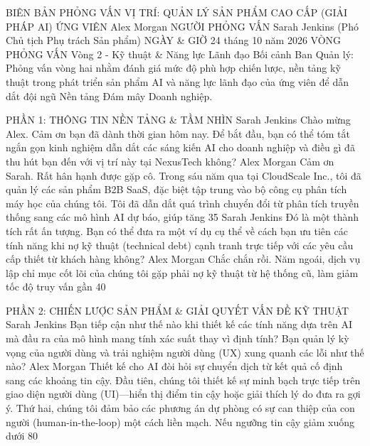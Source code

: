 BIÊN BẢN PHỎNG VẤN
VỊ TRÍ: QUẢN LÝ SẢN PHẨM CAO CẤP (GIẢI PHÁP AI)
ỨNG VIÊN
Alex Morgan
NGƯỜI PHỎNG VẤN
Sarah Jenkins (Phó Chủ tịch Phụ trách Sản phẩm)
NGÀY & GIỜ
24 tháng 10 năm 2026
VÒNG PHỎNG VẤN
Vòng 2 - Kỹ thuật & Năng lực Lãnh đạo
Bối cảnh Ban Quản lý: Phỏng vấn vòng hai nhằm đánh giá mức độ phù hợp chiến lược, nền tảng kỹ thuật trong phát triển sản phẩm AI và năng lực lãnh đạo của ứng viên để dẫn dắt đội ngũ Nền tảng Đám mây Doanh nghiệp.

PHẦN 1: THÔNG TIN NỀN TẢNG & TẦM NHÌN
Sarah Jenkins
Chào mừng Alex. Cảm ơn bạn đã dành thời gian hôm nay. Để bắt đầu, bạn có thể tóm tắt ngắn gọn kinh nghiệm dẫn dắt các sáng kiến AI cho doanh nghiệp và điều gì đã thu hút bạn đến với vị trí này tại NexusTech không?
Alex Morgan
Cảm ơn Sarah. Rất hân hạnh được gặp cô. Trong sáu năm qua tại CloudScale Inc., tôi đã quản lý các sản phẩm B2B SaaS, đặc biệt tập trung vào bộ công cụ phân tích máy học của chúng tôi. Tôi đã dẫn dắt quá trình chuyển đổi từ phân tích truyền thống sang các mô hình AI dự báo, giúp tăng 35%
Sarah Jenkins
Đó là một thành tích rất ấn tượng. Bạn có thể đưa ra một ví dụ cụ thể về cách bạn ưu tiên các tính năng khi nợ kỹ thuật (technical debt) cạnh tranh trực tiếp với các yêu cầu cấp thiết từ khách hàng không?
Alex Morgan
Chắc chắn rồi. Năm ngoái, dịch vụ lập chỉ mục cốt lõi của chúng tôi gặp phải nợ kỹ thuật từ hệ thống cũ, làm giảm tốc độ truy vấn gần 40%

PHẦN 2: CHIẾN LƯỢC SẢN PHẨM & GIẢI QUYẾT VẤN ĐỀ KỸ THUẬT
Sarah Jenkins
Bạn tiếp cận như thế nào khi thiết kế các tính năng dựa trên AI mà đầu ra của mô hình mang tính xác suất thay vì định tính? Bạn quản lý kỳ vọng của người dùng và trải nghiệm người dùng (UX) xung quanh các lỗi như thế nào?
Alex Morgan
Thiết kế cho AI đòi hỏi sự chuyển dịch từ kết quả cố định sang các khoảng tin cậy. Đầu tiên, chúng tôi thiết kế sự minh bạch trực tiếp trên giao diện người dùng (UI)—hiển thị điểm tin cậy hoặc giải thích lý do đưa ra gợi ý. Thứ hai, chúng tôi đảm bảo các phương án dự phòng có sự can thiệp của con người (human-in-the-loop) một cách liền mạch. Nếu ngưỡng tin cậy giảm xuống dưới 80%

